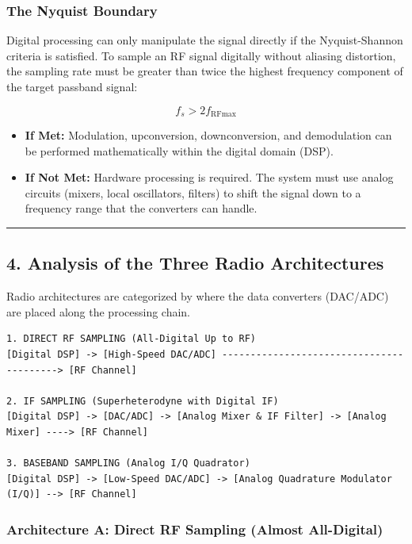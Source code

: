 \documentclass[
]{article}
\providecommand{\tightlist}{%
  \setlength{\itemsep}{0pt}\setlength{\parskip}{0pt}}
\begin{document}
\subsubsection{The Nyquist Boundary}\label{the-nyquist-boundary}

Digital processing can only manipulate the signal directly if the
Nyquist-Shannon criteria is satisfied. To sample an RF signal digitally
without aliasing distortion, the sampling rate must be greater than
twice the highest frequency component of the target passband signal:

\[f_s > 2f_{\text{RFmax}}\]

\begin{itemize}
\tightlist
\item
  \textbf{If Met:} Modulation, upconversion, downconversion, and
  demodulation can be performed mathematically within the digital domain
  (DSP).
\item
  \textbf{If Not Met:} Hardware processing is required. The system must
  use analog circuits (mixers, local oscillators, filters) to shift the
  signal down to a frequency range that the converters can handle.
\end{itemize}

\begin{center}\rule{0.5\linewidth}{0.5pt}\end{center}

\subsection{4. Analysis of the Three Radio
Architectures}\label{analysis-of-the-three-radio-architectures}

Radio architectures are categorized by where the data converters
(DAC/ADC) are placed along the processing chain.

\begin{verbatim}
1. DIRECT RF SAMPLING (All-Digital Up to RF)
[Digital DSP] -> [High-Speed DAC/ADC] -----------------------------------------> [RF Channel]

2. IF SAMPLING (Superheterodyne with Digital IF)
[Digital DSP] -> [DAC/ADC] -> [Analog Mixer & IF Filter] -> [Analog Mixer] ----> [RF Channel]

3. BASEBAND SAMPLING (Analog I/Q Quadrator)
[Digital DSP] -> [Low-Speed DAC/ADC] -> [Analog Quadrature Modulator (I/Q)] --> [RF Channel]
\end{verbatim}

\subsubsection{Architecture A: Direct RF Sampling (Almost
All-Digital)}\label{architecture-a-direct-rf-sampling-almost-all-digital}
\end{document}
